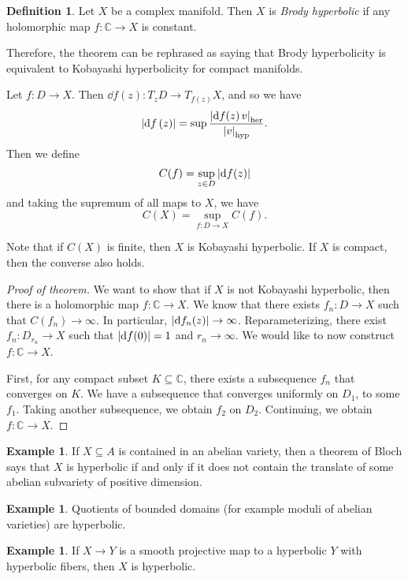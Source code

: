 \documentclass[leqno, openany]{memoir}
\theoremstyle{definition}
\newtheorem{defn}[thm]{Definition}
\newtheorem{exm}[thm]{Example}
\theoremstyle{remark}
\theoremstyle{plain}
\theoremstyle{definition}
\theoremstyle{remark}
\newcommand{\C}{\mathbb{C}}
\newcommand{\mr}[1]{\mathrm{#1}}
\begin{document}
\begin{defn}
    Let $X$ be a complex manifold. Then $X$ is \textit{Brody hyperbolic} if any holomorphic map $f \colon \C \to X$ is constant.
\end{defn}

Therefore, the theorem can be rephrased as saying that Brody hyperbolicity is equivalent to Kobayashi hyperbolicity for compact manifolds.

Let $f \colon D \to X$. Then $\dd{f(z)} \colon T_z D \to T_{f(z)} X$, and so we have
\[ \abs{\dd{f}(z)} = \sup \frac{\abs{\dd{f(z)} v}_{\mr{her}}}{\abs{v}_{\mr{hyp}}}. \]
Then we define
\[ C(f) = \sup_{z \in D} \abs{\dd{f(z)}} \]
and taking the supremum of all maps to $X$, we have
\[ C(X) = \sup_{f \colon D \to X} C(f). \]

Note that if $C(X)$ is finite, then $X$ is Kobayashi hyperbolic. If $X$ is compact, then the converse also holds.

\begin{proof}[Proof of theorem]
    We want to show that if $X$ is not Kobayashi hyperbolic, then there is a holomorphic map $f \colon \C \to X$. We know that there exists $f_n \colon D \to X$ such that $C(f_n) \to \infty$. In particular, $\abs{\dd{f_n(z)}} \to \infty$. Reparameterizing, there exist $f_n \colon D_{r_n} \to X$ such that $\abs{\dd{f(0)}} = 1$ and $r_n \to \infty$. We would like to now construct $f \colon \C \to X$.

    First, for any compact subset $K \subseteq \C$, there exists a subsequence $f_n$ that converges on $K$. We have a subsequence that converges uniformly on $D_1$, to some $f_1$. Taking another subsequence, we obtain $f_2$ on $D_2$. Continuing, we obtain $f \colon \C \to X$.
\end{proof}

\begin{exm}
    If $X \subseteq A$ is contained in an abelian variety, then a theorem of Bloch says that $X$ is hyperbolic if and only if it does not contain the translate of some abelian subvariety of positive dimension.
\end{exm}

\begin{exm}
    Quotients of bounded domains (for example moduli of abelian varieties) are hyperbolic.
\end{exm}

\begin{exm}
    If $X \to Y$ is a smooth projective map to a hyperbolic $Y$ with hyperbolic fibers, then $X$ is hyperbolic.
\end{exm}
\end{document}
